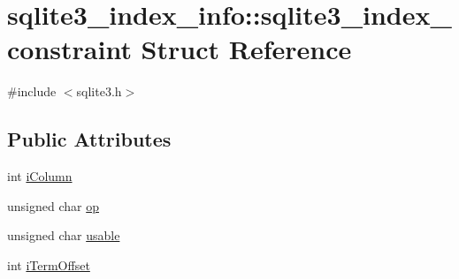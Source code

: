 \hypertarget{structsqlite3__index__info_1_1sqlite3__index__constraint}{\section{sqlite3\-\_\-index\-\_\-info\-:\-:sqlite3\-\_\-index\-\_\-constraint Struct Reference}
\label{structsqlite3__index__info_1_1sqlite3__index__constraint}
}


{\ttfamily \#include $<$sqlite3.\-h$>$}

\subsection*{Public Attributes}
\begin{DoxyCompactItemize}
\item 
int \hyperlink{structsqlite3__index__info_1_1sqlite3__index__constraint_a0f1e207060420058ee2881f2ea368e3a}{i\-Column}
\item 
unsigned char \hyperlink{structsqlite3__index__info_1_1sqlite3__index__constraint_a362f4ec1f71975cb0ac39a8b5e4b1476}{op}
\item 
unsigned char \hyperlink{structsqlite3__index__info_1_1sqlite3__index__constraint_ae16e62caeab743cc68bb22227dacb501}{usable}
\item 
int \hyperlink{structsqlite3__index__info_1_1sqlite3__index__constraint_a4e8368da66f34b7f07b369984b813d1b}{i\-Term\-Offset}
\end{DoxyCompactItemize}



